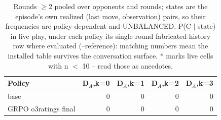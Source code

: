 \begin{table}[t]
\centering
\caption{Rounds $\geq$2 pooled over opponents and rounds; states are the episode's own realized (last move, observation) pairs, so their frequencies are policy-dependent and UNBALANCED. P(C $\mid$ state) in live play, under each policy its single-round fabricated-history row where evaluated (--reference): matching numbers mean the installed table survives the conversation surface. * marks live cells with n $<$ 10 -- read those as anecdotes.}
\label{tab:mr-live-states}
\small
\setlength{\tabcolsep}{3.5pt}
\begin{tabular}{lrrrr}
\toprule
Policy & D$_A$,k=0 & D$_A$,k=1 & D$_A$,k=2 & D$_A$,k=3 \\
\midrule
base & 0 & 0 & 0 & 0 \\
GRPO o3ratings final & 0 & 0 & 0 & 0 \\
\bottomrule
\end{tabular}
\end{table}
